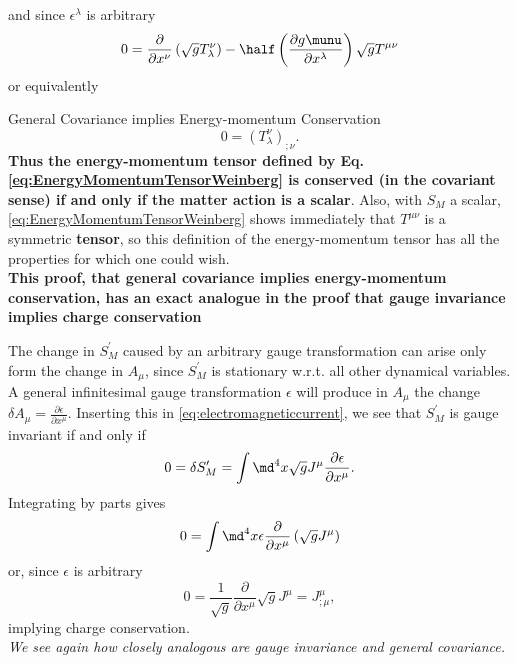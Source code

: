 and since $\epsilon^\lambda$ is arbitrary
\begin{equation}
	0 = \frac{\partial}{\partial x^\nu} \left(\sqrt{g} T^\nu_\lambda\right) - \half \left(\frac{\partial g\munu}{\partial x^\lambda}\right) \sqrt{g} T^{\mu \nu}
\end{equation}
or equivalently
\begin{mybox}{General Covariance implies Energy-momentum Conservation}
	\begin{equation}
		0= (T^\nu_\lambda)_{;\nu}.
	\end{equation}
	\textbf{Thus the energy-momentum tensor defined by Eq. \ref{eq:EnergyMomentumTensorWeinberg} is conserved (in the covariant sense) if and only if the matter action is a scalar}. Also, with $S_M$ a scalar, \ref{eq:EnergyMomentumTensorWeinberg} shows immediately that $T^{\mu \nu}$ is a symmetric \textbf{tensor}, so this definition of the energy-momentum tensor has all the properties for which one could wish.\\
	\textbf{This proof, that general covariance implies energy-momentum conservation, has an exact analogue in the proof that gauge invariance implies charge conservation}
\end{mybox}
The change in $S^\prime_M$ caused by an arbitrary gauge transformation can arise only form the change in $A_\mu$, since $S^\prime_M$ is stationary w.r.t. all other dynamical variables. A general infinitesimal gauge transformation $\epsilon$ will produce in $A_\mu$ the change $\delta A_\mu = \frac{\partial \epsilon}{\partial x^\mu}$. Inserting this in \ref{eq:electromagneticcurrent}, we see that $S^\prime_M$ is gauge invariant if and only if
\begin{equation}
0 = \delta S^\prime_M = \int \md^4 x \sqrt{g}J^\mu \frac{\partial \epsilon}{\partial x^\mu}.
\end{equation}
Integrating by parts gives
\begin{equation}
	0=\int \md^4 x \epsilon \frac{\partial}{\partial x^\mu} \left(\sqrt{g} J^\mu\right)
\end{equation}
or, since $\epsilon$ is arbitrary
\begin{equation}
	0=\frac{1}{\sqrt{g}} \frac{\partial}{\partial x^\mu} \sqrt{g} J^\mu = J^\mu_{;\mu},
\end{equation}
implying charge conservation. \\
\emph{We see again how closely analogous are gauge invariance and general covariance.}
